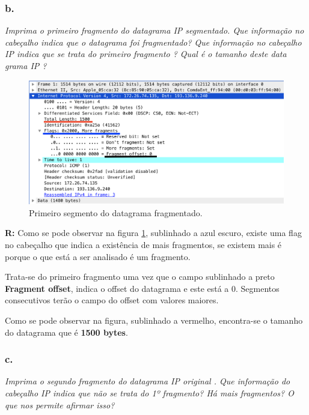 \documentclass{llncs}
\begin{document}
\subsubsection{b.}
\emph{Imprima  o  primeiro  fragmento  do  datagrama  IP  segmentado.  Que 
informação no cabeçalho indica que o datagrama foi fragmentado? Que 
informação no cabeçalho IP indica 
que 
se trata do primeiro
fragmento
?
Qual é o tamanho 
deste data
grama IP
?}

\begin{figure}[H]
\begin{center}
\includegraphics[scale=0.45]{3_b.png} 
\end{center}
\caption{\label{fig:3_b}Primeiro segmento do datagrama fragmentado.}
\end{figure}

\textbf{R:} Como se pode observar na figura \ref{fig:3_b}, sublinhado a azul escuro, existe uma flag no cabeçalho que indica a existência de mais fragmentos, se existem mais é porque o que está a ser analisado é um fragmento.

Trata-se do primeiro fragmento uma vez que o campo sublinhado a preto \textbf{Fragment offset}, indica o offset do datagrama e este está a 0. Segmentos consecutivos terão o campo do offset com valores maiores.

Como se pode observar na figura, sublinhado a vermelho, encontra-se o tamanho do datagrama que é \textbf{1500 bytes}.

\subsubsection{c.}
\emph{Imprima o 
segundo fragmento do datagrama 
IP
original
. Que informação 
do  cabeçalho  IP  indica  que  não  se  trata  do  1º  fragmento?  Há  mais 
fragmentos? O que nos permite afirmar isso?}
\end{document}
